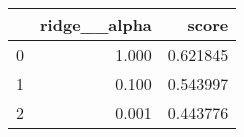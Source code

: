 \begin{tabular}{lrr}
\toprule
{} &  ridge\_\_alpha &     score \\
\midrule
0 &         1.000 &  0.621845 \\
1 &         0.100 &  0.543997 \\
2 &         0.001 &  0.443776 \\
\bottomrule
\end{tabular}
